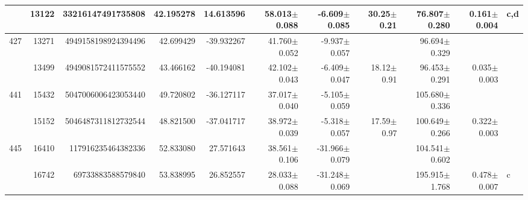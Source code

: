 \documentclass{ws-ijmpd}
\begin{document}
\begin{landscape}
\begin{longtable}{rrrrrrrrrrl}
            &   13122 &        33216147491735808 &                    42.195278 &                    14.613596 &                 58.013$\pm$0.088 &                 -6.609$\pm$0.085 &          30.25$\pm$  0.21 &        76.807$\pm$0.280 &                           0.161$\pm$0.004 &                                                c,d \\
 \hline 427 &   13271 &      4949158198924394496 &                    42.699429 &                   -39.932267 &                 41.760$\pm$0.052 &                 -9.937$\pm$0.057 &                           &        96.694$\pm$0.329 &                                           &                                                    \\
            &   13499 &      4949081572411575552 &                    43.466162 &                   -40.194081 &                 42.102$\pm$0.043 &                 -6.409$\pm$0.047 &          18.12$\pm$  0.91 &        96.453$\pm$0.291 &                           0.035$\pm$0.003 &                                                    \\
 \hline 441 &   15432 &      5047006006423053440 &                    49.720802 &                   -36.127117 &                 37.017$\pm$0.040 &                 -5.105$\pm$0.059 &                           &       105.680$\pm$0.336 &                                           &                                                    \\
            &   15152 &      5046487311812732544 &                    48.821500 &                   -37.041717 &                 38.972$\pm$0.039 &                 -5.318$\pm$0.057 &          17.59$\pm$  0.97 &       100.649$\pm$0.266 &                           0.322$\pm$0.003 &                                                    \\
 \hline 445 &   16410 &       117916235464382336 &                    52.833080 &                    27.571643 &                 38.561$\pm$0.106 &                -31.966$\pm$0.079 &                           &       104.541$\pm$0.602 &                                           &                                                    \\
            &   16742 &        69733883588579840 &                    53.838995 &                    26.852557 &                 28.033$\pm$0.088 &                -31.248$\pm$0.069 &                           &       195.915$\pm$1.768 &                           0.478$\pm$0.007 &                                                  c \\

\end{longtable}
\end{landscape}
\end{document}
